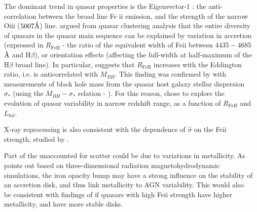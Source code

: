 \documentclass[twocolumn]{aastex62}
\let\oldAA\AA
\renewcommand{\AA}{\text{\normalfont\oldAA}}
\begin{document}
The dominant trend in quasar properties is the Eigenvector-1 : the anti-correlation between the broad line Fe {\sc ii} emission, and the strength of the narrow O{\sc iii} ($5007 \mbox{\AA}$) line\cite{wang1996}. \citep{shen2014} argued from quasar clustering analysis that the entire diversity of quasars in  the quasar main sequence can be explained by variation in accretion (expressed in $R_{\mathrm{Fe  II}}$ - the ratio of the equivalent width of   Fe{\sc ii}  between $4435-4685$ $\mbox{\AA}$ and H$\beta$), or orientation effects (affecting the full-width at half-maximum of the H$\beta$ broad line). In particular, \citep{shen2014} suggests that $R_{\mathrm{Fe  II}}$ increases with  the Eddington ratio, i.e. is anticorrelated with $M_{BH}$. This finding was confirmed by \cite{sun2015} with measurements of black hole mass from the quasar host galaxy stellar dispersion $\sigma_{*}$ (using the $M_{BH} - \sigma_{*}$ relation - \citealt{ferrarese2000, kormendy2013}). For this reason,  \citep{sun2018} chose to explore the evolution of quasar variability in narrow redshift range, as a function of  $R_{\mathrm{Fe  II}}$ and $L_{bol}$. 



X-ray reprocessing is also consistent with  the dependence of $\hat{\sigma}$ on the Fe{\sc ii} strength, studied by \citep{sun2018}. 


Part of the unaccounted for scatter could be due to variations in metallicity.  As \cite{jiang2016} points out based on three-dimensional radiation magnetohydrodynamic simulations, the iron opacity bump may have a strong influence on the stability of an accretion disk, and thus link metallicity to AGN variability. This would also be consistent with findings of \cite{sun2018} if quasars with high  Fe{\sc ii} strength have higher metallicity, and have more stable disks. 

\end{document}
